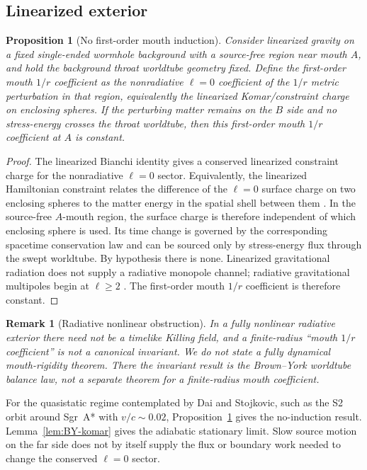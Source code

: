 \documentclass[aps,prd,10pt,onecolumn,nofootinbib,superscriptaddress,floatfix]{revtex4-2}
\newtheorem{proposition}{Proposition}
\newtheorem{remark}{Remark}
\begin{document}
\subsection{Linearized exterior}

\begin{proposition}[No first-order mouth induction]
\label{prop:linearized}
Consider linearized gravity on a fixed single-ended wormhole background with a
source-free region near mouth $A$, and hold the background throat worldtube
geometry fixed.  Define the first-order mouth $1/r$ coefficient as the nonradiative
$\ell=0$ coefficient of the $1/r$ metric perturbation in that region,
equivalently the linearized Komar/constraint charge on enclosing spheres.  If
the perturbing matter remains on the $B$ side and no stress-energy crosses the
throat worldtube, then this first-order mouth $1/r$ coefficient at $A$ is
constant.
\end{proposition}

\begin{proof}
The linearized Bianchi identity gives a conserved linearized constraint charge
for the nonradiative $\ell=0$ sector.  Equivalently, the linearized Hamiltonian
constraint relates the difference of the $\ell=0$ surface charge on two
enclosing spheres to the matter energy in the spatial shell between them
\cite{ReggeTeitelboim1974SurfaceIntegrals,AbbottDeser1982Stability}.  In the
source-free $A$-mouth region, the surface charge is therefore independent of
which enclosing sphere is used.  Its time change is governed by the
corresponding spacetime conservation law and can be sourced only by
stress-energy flux through the swept worldtube.  By hypothesis there is none.
Linearized gravitational radiation does not supply a radiative monopole
channel; radiative gravitational multipoles begin at $\ell\ge2$
\cite{Thorne1980Multipole}.  The first-order mouth $1/r$ coefficient is
therefore constant.
\end{proof}

\begin{remark}[Radiative nonlinear obstruction]
In a fully nonlinear radiative exterior there need not be a timelike Killing
field, and a finite-radius ``mouth $1/r$ coefficient'' is not a canonical
invariant.  We do not state a fully dynamical mouth-rigidity theorem.  There
the invariant result is the Brown--York worldtube balance law, not a separate
theorem for a finite-radius mouth coefficient.
\end{remark}

For the quasistatic regime contemplated by Dai and Stojkovic, such as the S2
orbit around Sgr~A* with $v/c\sim0.02$, Proposition~\ref{prop:linearized} gives
the no-induction result.  Lemma~\ref{lem:BY-komar} gives the adiabatic
stationary limit.  Slow source motion on the far side does not by itself supply
the flux or boundary work needed to change the conserved $\ell=0$ sector.
\end{document}
